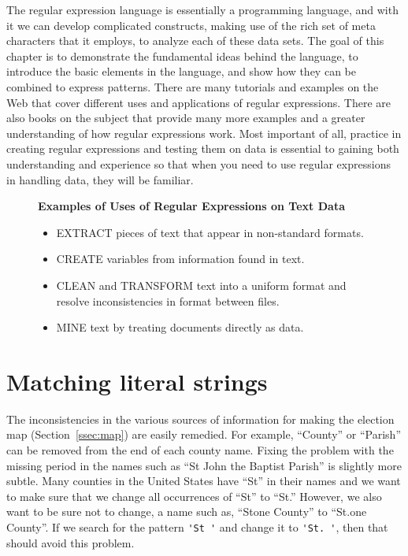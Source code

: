 The regular expression language is essentially a programming language,
and with it we can develop complicated constructs, making use of the
rich set of meta characters that it employs, to analyze each of these
data sets.  The goal of this chapter is to demonstrate the fundamental
ideas behind the language, to introduce the basic elements in the
language, and show how they can be combined to express patterns.
There are many tutorials and examples on the Web that cover different
uses and applications of regular expressions.  There are also books on
the subject that provide many more examples and a greater
understanding of how regular expressions work.  Most important of all,
practice in creating regular expressions and testing them on data is
essential to gaining both understanding and experience so that when
you need to use regular expressions in handling data, they will be
familiar.


\begin{figure}
\begin{center}
\textbf{Examples of Uses of Regular Expressions on Text Data}
\end{center}
\begin{itemize}
\item EXTRACT pieces of text that appear in non-standard formats.

\item CREATE variables from information found in text.

\item CLEAN and TRANSFORM text into a uniform format and resolve inconsistencies in format between files. 

\item MINE text by treating documents directly as data.

\end{itemize}
\end{figure}


\section{Matching literal strings}

The inconsistencies in the various sources of information for making
the election map (Section~\ref{ssec:map}) are easily remedied.  For
example, ``County'' or ``Parish'' can be removed from the end of each
county name.  Fixing the problem with the missing period in the names
such as ``St John the Baptist Parish'' is slightly more subtle.  Many
counties in the United States have ``St'' in their names and we want
to make sure that we change all occurrences of ``St'' to ``St.''
However, we also want to be sure not to change, a name such as,
``Stone County'' to ``St.one County''.  If we search for the pattern
\verb+'St '+ and change it to \verb+'St. '+, then that should avoid
this problem.
 
